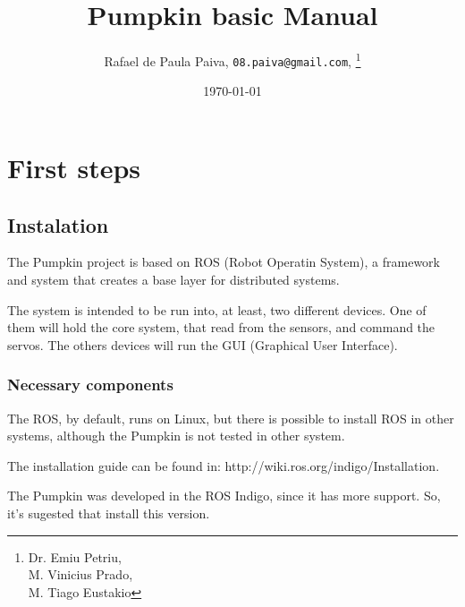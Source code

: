 \documentclass[twoside,a4paper,titlepage]{article}
\title{Pumpkin basic Manual}
\author{Rafael de Paula Paiva,
		\texttt{08.paiva@gmail.com},
		\thanks{Dr. Emiu Petriu,\\ 
		M. Vinicius Prado,\\
		M. Tiago Eustakio}}
\date{\today}
\begin{document}
\maketitle
\tableofcontents
\newpage

\section{First steps}

\subsection{Instalation}

The Pumpkin project is based on ROS (Robot Operatin System), a framework and system that creates a base layer for distributed systems.

The system is intended to be run into, at least, two different devices. One of them will hold the core system, that read from the sensors, and command the servos. The others devices will run the GUI (Graphical User Interface).

\subsubsection{Necessary components}

The ROS, by default, runs on Linux, but there is possible to install ROS in other systems, although the Pumpkin is not tested in other system.

The installation guide can be found in: http://wiki.ros.org/indigo/Installation.

The Pumpkin was developed in the ROS Indigo, since it has more support. So, it's sugested that install this version.
\end{document}

